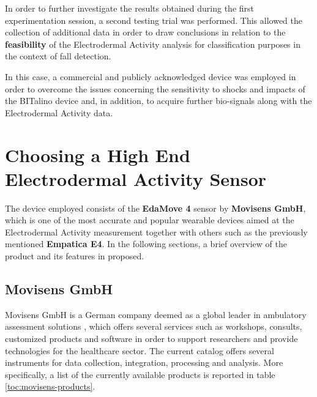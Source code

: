 \label{ch:collection}

In order to further investigate the results obtained during the first experimentation session, a second testing trial was performed. This allowed the collection of additional data in order to draw conclusions in relation to the \textbf{feasibility} of the Electrodermal Activity analysis for classification purposes in the context of fall detection.

In this case, a commercial and publicly acknowledged device was employed in order to overcome the issues concerning the sensitivity to shocks and impacts of the BITalino device and, in addition, to acquire further bio-signals along with the Electrodermal Activity data.

\section{Choosing a High End Electrodermal Activity Sensor}\label{sec:movisens}

The device employed consists of the \textbf{EdaMove 4} sensor by \textbf{Movisens GmbH}, which is one of the most accurate and popular wearable devices aimed at the Electrodermal Activity measurement together with others such as the previously mentioned \textbf{Empatica E4}. In the following sections, a brief overview of the product and its features in proposed.

\subsection{Movisens GmbH}\label{subsec:movisens-company}

Movisens GmbH is a German company deemed as a global leader in ambulatory assessment solutions \cite{movisens}, which offers several services such as workshops, consults, customized products and software in order to support researchers and provide technologies for the healthcare sector.
The current catalog offers several instruments for data collection, integration, processing and analysis. More specifically, a list of the currently available products is reported in table \ref{toc:movisens-products}.

